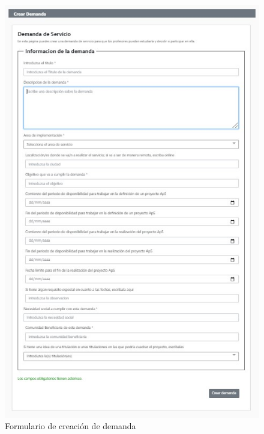 \documentclass[11pt]{book}
\begin{document}
 \begin{figure}[t]
 	\centering
 	\includegraphics[scale=0.9]{demanda}
 	\caption{Formulario de creación de demanda}
 \end{figure}
\end{document}
